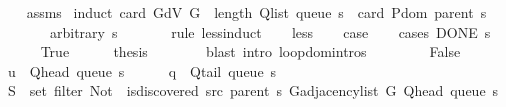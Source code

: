 \begin{isabellebody}
%
\isadelimproof
\ \ %
\endisadelimproof
%
\isatagproof
{}\isamarkupfalse%
\ assms%
\endisatagproof
{\isafoldproof}%
%
\isadelimproof
\isanewline
%
\endisadelimproof
%
\isadelimvisible
%
\endisadelimvisible
%
\isatagvisible
{}\isamarkupfalse%
\ {\isacharparenleft}{\kern0pt}induct\ {\isachardoublequoteopen}card\ {\isacharparenleft}{\kern0pt}G{\isachardot}{\kern0pt}dV\ G{\isacharparenright}{\kern0pt}\ {\isacharplus}{\kern0pt}\ length\ {\isacharparenleft}{\kern0pt}Q{\isacharunderscore}{\kern0pt}list\ {\isacharparenleft}{\kern0pt}queue\ s{\isacharparenright}{\kern0pt}{\isacharparenright}{\kern0pt}\ {\isacharminus}{\kern0pt}\ card\ {\isacharparenleft}{\kern0pt}P{\isachardot}{\kern0pt}dom\ {\isacharparenleft}{\kern0pt}parent\ s{\isacharparenright}{\kern0pt}{\isacharparenright}{\kern0pt}{\isachardoublequoteclose}\isanewline
\ \ \ \ \ \ \ arbitrary{\isacharcolon}{\kern0pt}\ s\isanewline
\ \ \ \ \ \ \ rule{\isacharcolon}{\kern0pt}\ less{\isacharunderscore}{\kern0pt}induct{\isacharparenright}{\kern0pt}\isanewline
\ \ \isamarkupfalse%
\ less\isanewline
\ \ \isamarkupfalse%
\ {\isacharquery}{\kern0pt}case\isanewline
\ \ \isamarkupfalse%
\ {\isacharparenleft}{\kern0pt}cases\ {\isachardoublequoteopen}DONE\ s{\isachardoublequoteclose}{\isacharparenright}{\kern0pt}\isanewline
\ \ \ \ \isamarkupfalse%
\ True\isanewline
\ \ \ \ \isamarkupfalse%
\ {\isacharquery}{\kern0pt}thesis\isanewline
\ \ \ \ \ \ \isamarkupfalse%
\ {\isacharparenleft}{\kern0pt}blast\ intro{\isacharcolon}{\kern0pt}\ loop{\isachardot}{\kern0pt}domintros{\isacharparenright}{\kern0pt}\isanewline
\ \ \isamarkupfalse%
\isanewline
\ \ \ \ \isamarkupfalse%
\ False\isanewline
\ \ \ \ \isamarkupfalse%
\ {\isacharquery}{\kern0pt}u\ {\isacharequal}{\kern0pt}\ {\isachardoublequoteopen}Q{\isacharunderscore}{\kern0pt}head\ {\isacharparenleft}{\kern0pt}queue\ s{\isacharparenright}{\kern0pt}{\isachardoublequoteclose}\isanewline
\ \ \ \ \isamarkupfalse%
\ {\isacharquery}{\kern0pt}q\ {\isacharequal}{\kern0pt}\ {\isachardoublequoteopen}Q{\isacharunderscore}{\kern0pt}tail\ {\isacharparenleft}{\kern0pt}queue\ s{\isacharparenright}{\kern0pt}{\isachardoublequoteclose}\isanewline
\ \ \ \ \isamarkupfalse%
\ {\isacharquery}{\kern0pt}S\ {\isacharequal}{\kern0pt}\ {\isachardoublequoteopen}set\ {\isacharparenleft}{\kern0pt}filter\ {\isacharparenleft}{\kern0pt}Not\ {\isasymcirc}\ is{\isacharunderscore}{\kern0pt}discovered\ src\ {\isacharparenleft}{\kern0pt}parent\ s{\isacharparenright}{\kern0pt}{\isacharparenright}{\kern0pt}\ {\isacharparenleft}{\kern0pt}G{\isachardot}{\kern0pt}adjacency{\isacharunderscore}{\kern0pt}list\ G\ {\isacharparenleft}{\kern0pt}Q{\isacharunderscore}{\kern0pt}head\ {\isacharparenleft}{\kern0pt}queue\ s{\isacharparenright}{\kern0pt}{\isacharparenright}{\kern0pt}{\isacharparenright}{\kern0pt}{\isacharparenright}{\kern0pt}{\isachardoublequoteclose}\isanewline

\end{isabellebody}
